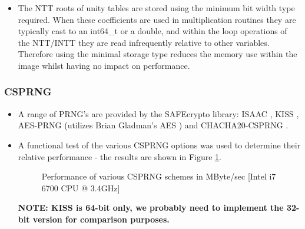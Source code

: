 \begin{itemize}
  \item The NTT roots of unity tables are stored using the minimum bit width type required. When these coefficients are used in multiplication routines they are typically cast to an int64\_t or a double, and within the loop operations of the NTT/INTT they are read infrequently relative to other variables. Therefore using the minimal storage type reduces the memory use within the image whilst having no impact on performance.
\end{itemize}

\subsubsection{CSPRNG}
\begin{itemize}

  \item A range of PRNG's are provided by the SAFEcrypto library: ISAAC \cite{issac}, KISS \cite{kiss}, AES-PRNG (utilizes Brian Gladman's AES \cite{aes_gladman}) and CHACHA20-CSPRNG \cite{chacha20_csprng}.
  \item A functional test of the various CSPRNG options was used to determine their relative performance - the results are shown in Figure \ref{fig:hash_mbyte_per_sec}.

\pgfplotsset{compat=1.13,width=10cm,height=9cm}
\begin{figure}[ht!]
\centering
{}
\caption{Performance of various CSPRNG schemes in MByte/sec [Intel i7 6700 CPU @ 3.4GHz]}
\label{fig:hash_mbyte_per_sec}
\end{figure}

\noindent \textbf{NOTE: KISS is 64-bit only, we probably need to implement the 32-bit version for comparison purposes.}


\end{itemize}
